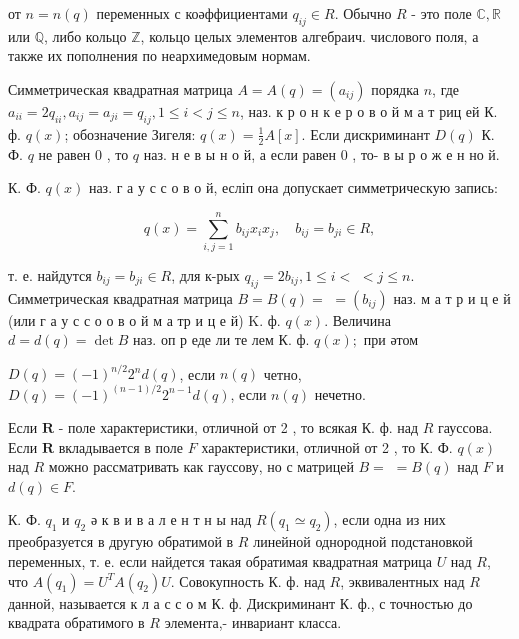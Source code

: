 \documentclass[10pt]{article}
\begin{document}
от $n=n(q)$ переменных с коәффициентами $q_{i j} \in R$. Обычно $R$ - это поле $\mathbb{C}, \mathbb{R}$ или $\mathbb{Q}$, либо кольцо $\mathbb{Z}$, кольцо целых элементов алгебраич. числового поля, а также их пополнения по неархимедовым нормам.



Симметрическая квадратная матрица $A=A(q)=\left(a_{i j}\right)$ порядка $n$, где $a_{i i}=2 q_{i i}, a_{i j}=a_{j i}=q_{i j}, 1 \leqslant i<j \leqslant n$, наз. к р о н к е р о в о й м а т риц ей К. ф. $q(x)$; обозначение Зигеля: $q(x)=\frac{1}{2} A[x]$. Если дискриминант $D(q)$ К. Ф. $q$ не равен 0 , то $q$ наз. н е в ы н о й, а если равен 0 , то- в ы р о ж е н но й.



К. Ф. $q(x)$ наз. г а у с с о в о й, есліп она допускает симметрическую запись:



\[

q(x)=\sum_{i, j=1}^{n} b_{i j} x_{i} x_{j}, \quad b_{i j}=b_{j i} \in R,

\]



т. е. найдутся $b_{i j}=b_{j i} \in R$, для к-рых $q_{i j}=2 b_{i j}, 1 \leqslant i<$ $<j \leqslant n$. Симметрическая квадратная матрица $B=B(q)=$ $=\left(b_{i j}\right)$ наз. м а т р и ц е й (или г а у с с о о в о й м а тр и ц е й) K. ф. $q(x)$. Величина $d=d(q)=\operatorname{det} B$ наз. оп р еде ли те лем К. ф. $q(x) ;$ при әтом



$D(q)=(-1)^{n / 2} 2^{n} d(q)$, если $n(q)$ четно, $D(q)=(-1)^{(n-1) / 2} 2^{n-1} d(q)$, если $n(q)$ нечетно.



Если $\boldsymbol{R}$ - поле характеристики, отличной от 2 , то всякая К. ф. над $R$ гауссова. Если $\boldsymbol{R}$ вкладывается в поле $F$ характеристики, отличной от 2 , то К. Ф. $q(x)$ над $R$ можно рассматривать как гауссову, но с матрицей $B=$ $=B(q)$ над $F$ и $d(q) \in F$.



К. Ф. $q_{1}$ и $q_{2}$ ә к в и в а л е н т н ы над $R\left(q_{1} \simeq q_{2}\right)$, если одна из них преобразуется в другую обратимой в $R$ линейной однородной подстановкой переменных, т. е. если найдется такая обратимая квадратная матрица $U$ над $R$, что $A\left(q_{1}\right)=U^{T} A\left(q_{2}\right) U$. Совокупность К. ф. над $R$, эквивалентных над $R$ данной, называется к л а с с о м К. ф. Дискриминант К. ф., с точностью до квадрата обратимого в $R$ элемента,- инвариант класса.
\end{document}
